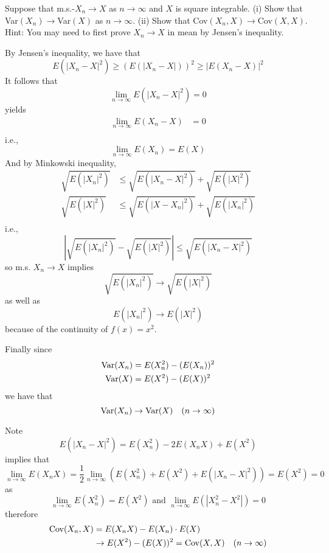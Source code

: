     \problem
    \begin{question}
        Suppose that m.s.-$X_n\rightarrow X$ as $n\rightarrow \infty$
        and $X$ is square integrable.  (i)  Show that
        Var$(X_n)\rightarrow$Var$(X)$ as $n\rightarrow \infty$.
        (ii) Show that Cov$(X_n,X)\rightarrow$Cov$(X,X)$.
        Hint:  You may need to first prove $X_n\rightarrow X$ in mean by Jensen's inequality.
    \end{question}
    \begin{subproblem}
        \item
        By Jensen's inequality, we have that
        \[E(|X_n-X|^2)\geq (E(|X_n-X|))^2\geq |E(X_n-X)|^2\]
        It follows that 
        \[\lim_{n\to\infty}E(|X_n-X|^2)=0\]
        yields
        \[\begin{aligned}
            \lim_{n\to\infty}E(X_n-X)&=0\\
        \end{aligned}\]
        i.e.,
        \[\lim_{n\to\infty}E(X_n)=E(X)\]
        And by Minkowski inequality,
        \[\begin{aligned}
            \sqrt{E(|X_n|^2)}&\leq\sqrt{E(|X_n-X|^2)}+\sqrt{E(|X|^2)}\\
            \sqrt{E(|X|^2)}&\leq\sqrt{E(|X-X_n|^2)}+\sqrt{E(|X_n|^2)}\\
        \end{aligned}\]
        i.e.,
        \[\left|\sqrt{E(|X_n|^2)}-\sqrt{E(|X|^2)}\right|
        \leq\sqrt{E(|X_n-X|^2)}\]
        so m.s. $X_n\to X$ implies
        \[\sqrt{E(|X_n|^2)}\to\sqrt{E(|X|^2)}\]
        as well as
        \[E(|X_n|^2)\to E(|X|^2)\]
        because of the continuity of $f(x)=x^2$.

        Finally since
        \[\begin{aligned}
            \mathrm{Var}(X_n)&=E(X_n^2)-(E(X_n))^2\\
            \mathrm{Var}(X)&=E(X^2)-(E(X))^2
        \end{aligned}\]
        we have that
        \[\mathrm{Var}(X_n)\to\mathrm{Var}(X)\quad(n\to\infty)\]

        \item
        Note
        \[E(|X_n-X|^2)=E(X_n^2)-2E(X_nX)+E(X^2)\]
        implies that
        \[\lim_{n\to\infty}E(X_nX)
        =\frac{1}{2}\lim_{n\to\infty}\left(E(X_n^2)+E(X^2)+E(|X_n-X|^2)\right)
        =E(X^2)=0\]
        as
        \[\lim_{n\to\infty}E(X_n^2)=E(X^2)
        \text{ and }
        \lim_{n\to\infty}E(|X_n^2-X^2|)=0\]
        therefore
        \[\begin{aligned}
            \mathrm{Cov}(X_n,X)&=E(X_nX)-E(X_n)\cdot E(X)\\
            &\to E(X^2)-(E(X))^2=\mathrm{Cov}(X,X)\quad(n\to\infty)
        \end{aligned}\]
    \end{subproblem}

